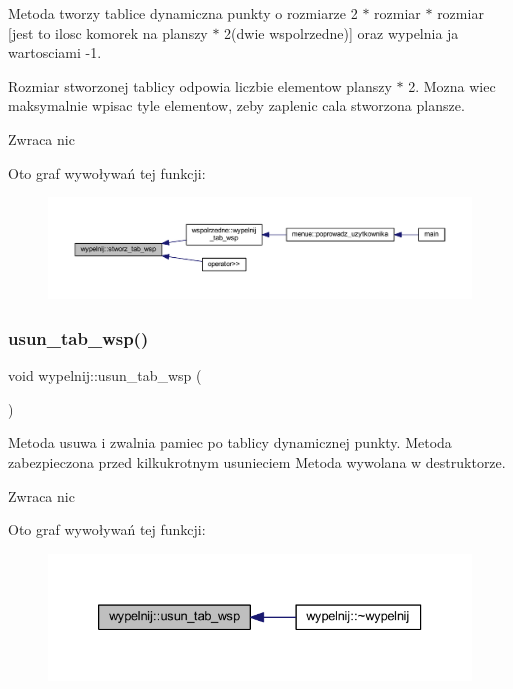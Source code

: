 Metoda tworzy tablice dynamiczna punkty o rozmiarze 2 $\ast$ rozmiar $\ast$ rozmiar \mbox{[}jest to ilosc komorek na planszy $\ast$ 2(dwie wspolrzedne)\mbox{]} oraz wypelnia ja wartosciami -\/1.

Rozmiar stworzonej tablicy odpowia liczbie elementow planszy $\ast$ 2. Mozna wiec maksymalnie wpisac tyle elementow, zeby zaplenic cala stworzona plansze. \begin{DoxyReturn}{Zwraca}
nic 
\end{DoxyReturn}
Oto graf wywoływań tej funkcji\+:
\nopagebreak
\begin{figure}[H]
\begin{center}
\leavevmode
\includegraphics[width=350pt]{classwypelnij_a8dfa84177176a7069f959c988015006f_icgraph}
\end{center}
\end{figure}
\mbox{\label{classwypelnij_af326848988a108fa3ea9fe98afe31ea2}} 
\subsubsection{\texorpdfstring{usun\+\_\+tab\+\_\+wsp()}{usun\_tab\_wsp()}}
{\footnotesize\ttfamily void wypelnij\+::usun\+\_\+tab\+\_\+wsp (\begin{DoxyParamCaption}{ }\end{DoxyParamCaption})}

Metoda usuwa i zwalnia pamiec po tablicy dynamicznej punkty. Metoda zabezpieczona przed kilkukrotnym usunieciem Metoda wywolana w destruktorze. \begin{DoxyReturn}{Zwraca}
nic 
\end{DoxyReturn}
Oto graf wywoływań tej funkcji\+:
\nopagebreak
\begin{figure}[H]
\begin{center}
\leavevmode
\includegraphics[width=333pt]{classwypelnij_af326848988a108fa3ea9fe98afe31ea2_icgraph}
\end{center}
\end{figure}
\mbox{\label{classwypelnij_a0bdc69f47a3ce9917e22b09c02e2ec86}} 
